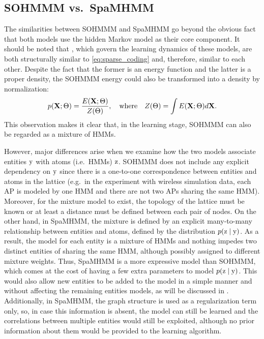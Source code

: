 \subsection{SOHMMM vs.\ SpaMHMM}
The similarities between SOHMMM and SpaMHMM go beyond the obvious fact that both models use the hidden Markov model as their core component. It should be noted that , which govern the learning dynamics of these models, are both structurally similar to \eqref{eq:sparse_coding} and, therefore, similar to each other. Despite the fact that the former is an energy function and the latter is a proper density, the SOHMMM energy  could also be transformed into a density by normalization:
\begin{equation}
\label{eq:sohmmm_normalized}
p({\mathbf{X}}; \Theta) = \frac{E({\mathbf{X}}; \Theta)}{Z(\Theta)}, \quad \text{where} \quad Z(\Theta) = \int E({\mathbf{X}}; \Theta) d{\mathbf{X}}.
\end{equation}
This observation makes it clear that, in the learning stage, SOHMMM can also be regarded as a mixture of HMMs.

However, major differences arise when we examine how the two models associate entities ${\textnormal{y}}$ with atoms (i.e.\ HMMs) ${\textnormal{z}}$. SOHMMM does not include any explicit dependency on ${\textnormal{y}}$ since there is a one-to-one correspondence between entities and atoms in the lattice (e.g.\ in the experiment with wireless simulation data, each AP is modeled by one HMM and there are not two APs sharing the same HMM). Moreover, for the mixture model to exist, the topology of the lattice must be known or at least a distance must be defined between each pair of nodes. On the other hand, in SpaMHMM, the mixture is defined by an explicit many-to-many relationship between entities and atoms, defined by the distribution $p({\textnormal{z}} \mid {\textnormal{y}})$. As a result, the model for each entity is a mixture of HMMs and nothing impedes two distinct entities of sharing the same HMM, although possibly assigned to different mixture weights. Thus, SpaMHMM is a more expressive model than SOHMMM, which comes at the cost of having a few extra parameters to model $p({\textnormal{z}} \mid {\textnormal{y}})$. This would also allow new entities to be added to the model in a simple manner and without affecting the remaining entities models, as will be discussed in . Additionally, in SpaMHMM, the graph structure is used as a regularization term only, so, in case this information is absent, the model can still be learned and the correlations between multiple entities would still be exploited, although no prior information about them would be provided to the learning algorithm.

